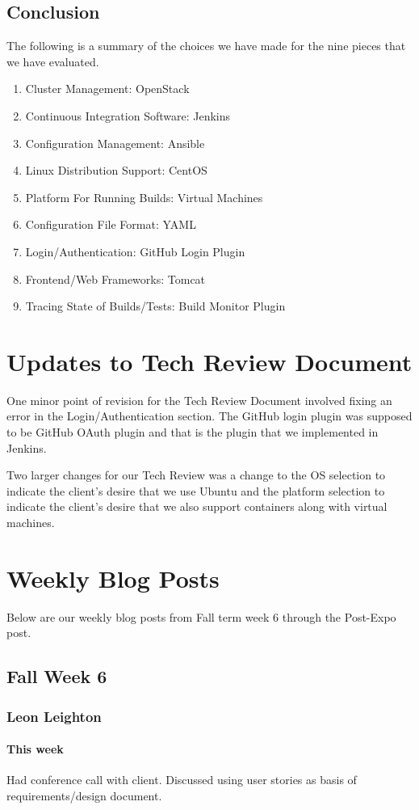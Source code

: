 \documentclass[10pt,letterpaper,onecolumn,draftclsnofoot]{IEEEtran}
\begin{document}
\subsection{Conclusion}
The following is a summary of the choices we have made for the nine pieces that we have evaluated.\\
\begin{enumerate}
  \item Cluster Management: OpenStack
  \item Continuous Integration Software: Jenkins
  \item Configuration Management: Ansible
  \item Linux Distribution Support: CentOS
  \item Platform For Running Builds: Virtual Machines
  \item Configuration File Format: YAML
  \item Login/Authentication: GitHub Login Plugin
  \item Frontend/Web Frameworks: Tomcat
  \item Tracing State of Builds/Tests: Build Monitor Plugin
\end{enumerate}
\section{Updates to Tech Review Document}
One minor point of revision for the Tech Review Document involved fixing an error in the Login/Authentication section.
The GitHub login plugin was supposed to be GitHub OAuth plugin and that is the plugin that we implemented in Jenkins.  

Two larger changes for our Tech Review was a change to the OS selection to indicate the client's desire that we use Ubuntu
and the platform selection to indicate the client's desire that we also support containers along with virtual machines.
\clearpage
\section{Weekly Blog Posts}
Below are our weekly blog posts from Fall term week 6 through the Post-Expo post.
\subsection{Fall Week 6}
\subsubsection{Leon Leighton}
\paragraph{This week} Had conference call with client. Discussed using user stories as basis of requirements/design document.
\end{document}
